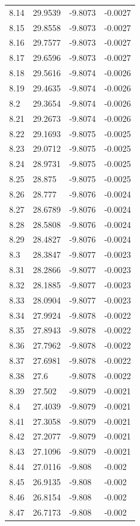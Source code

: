 \begin{tabular}{llll}
8.14 & 29.9539 & -9.8073 & -0.0027 \\
8.15 & 29.8558 & -9.8073 & -0.0027 \\
8.16 & 29.7577 & -9.8073 & -0.0027 \\
8.17 & 29.6596 & -9.8073 & -0.0027 \\
8.18 & 29.5616 & -9.8074 & -0.0026 \\
8.19 & 29.4635 & -9.8074 & -0.0026 \\
8.2 & 29.3654 & -9.8074 & -0.0026 \\
8.21 & 29.2673 & -9.8074 & -0.0026 \\
8.22 & 29.1693 & -9.8075 & -0.0025 \\
8.23 & 29.0712 & -9.8075 & -0.0025 \\
8.24 & 28.9731 & -9.8075 & -0.0025 \\
8.25 & 28.875 & -9.8075 & -0.0025 \\
8.26 & 28.777 & -9.8076 & -0.0024 \\
8.27 & 28.6789 & -9.8076 & -0.0024 \\
8.28 & 28.5808 & -9.8076 & -0.0024 \\
8.29 & 28.4827 & -9.8076 & -0.0024 \\
8.3 & 28.3847 & -9.8077 & -0.0023 \\
8.31 & 28.2866 & -9.8077 & -0.0023 \\
8.32 & 28.1885 & -9.8077 & -0.0023 \\
8.33 & 28.0904 & -9.8077 & -0.0023 \\
8.34 & 27.9924 & -9.8078 & -0.0022 \\
8.35 & 27.8943 & -9.8078 & -0.0022 \\
8.36 & 27.7962 & -9.8078 & -0.0022 \\
8.37 & 27.6981 & -9.8078 & -0.0022 \\
8.38 & 27.6 & -9.8078 & -0.0022 \\
8.39 & 27.502 & -9.8079 & -0.0021 \\
8.4 & 27.4039 & -9.8079 & -0.0021 \\
8.41 & 27.3058 & -9.8079 & -0.0021 \\
8.42 & 27.2077 & -9.8079 & -0.0021 \\
8.43 & 27.1096 & -9.8079 & -0.0021 \\
8.44 & 27.0116 & -9.808 & -0.002 \\
8.45 & 26.9135 & -9.808 & -0.002 \\
8.46 & 26.8154 & -9.808 & -0.002 \\
8.47 & 26.7173 & -9.808 & -0.002 \\

\end{tabular}
